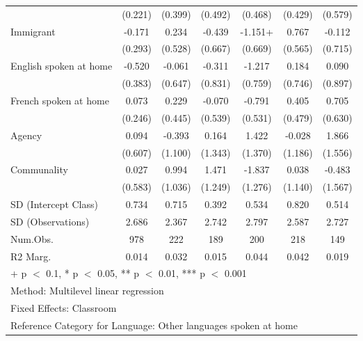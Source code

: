 \documentclass[
  letterpaper,
  DIV=11,
  numbers=noendperiod]{scrreprt}
\begin{document}
\begin{table}
\begin{tabular}[t]{lcccccc}
\hspace{1em} & (0.221) & (0.399) & (0.492) & (0.468) & (0.429) & (0.579)\\
\hspace{1em}Immigrant & -0.171 & 0.234 & -0.439 & -1.151+ & 0.767 & -0.112\\
\hspace{1em} & (0.293) & (0.528) & (0.667) & (0.669) & (0.565) & (0.715)\\
\hspace{1em}English spoken at home & -0.520 & -0.061 & -0.311 & -1.217 & 0.184 & 0.090\\
\hspace{1em} & (0.383) & (0.647) & (0.831) & (0.759) & (0.746) & (0.897)\\
\hspace{1em}French spoken at home & 0.073 & 0.229 & -0.070 & -0.791 & 0.405 & 0.705\\
\hspace{1em} & (0.246) & (0.445) & (0.539) & (0.531) & (0.479) & (0.630)\\
\hspace{1em}Agency & 0.094 & -0.393 & 0.164 & 1.422 & -0.028 & 1.866\\
\hspace{1em} & (0.607) & (1.100) & (1.343) & (1.370) & (1.186) & (1.556)\\
\hspace{1em}Communality & 0.027 & 0.994 & 1.471 & -1.837 & 0.038 & -0.483\\
\hspace{1em} & (0.583) & (1.036) & (1.249) & (1.276) & (1.140) & (1.567)\\
\hspace{1em}SD (Intercept Class) & 0.734 & 0.715 & 0.392 & 0.534 & 0.820 & 0.514\\
\hspace{1em}SD (Observations) & 2.686 & 2.367 & 2.742 & 2.797 & 2.587 & 2.727\\
\hspace{1em}Num.Obs. & 978 & 222 & 189 & 200 & 218 & 149\\
\hspace{1em}R2 Marg. & 0.014 & 0.032 & 0.015 & 0.044 & 0.042 & 0.019\\
\bottomrule
\multicolumn{7}{l}{\rule{0pt}{1em}+ p $<$ 0.1, * p $<$ 0.05, ** p $<$ 0.01, *** p $<$ 0.001}\\
\multicolumn{7}{l}{\rule{0pt}{1em}Method: Multilevel linear regression}\\
\multicolumn{7}{l}{\rule{0pt}{1em}Fixed Effects: Classroom}\\
\multicolumn{7}{l}{\rule{0pt}{1em}Reference Category for Language: Other languages spoken at home}\\
\end{tabular}
\end{table}
\end{document}
